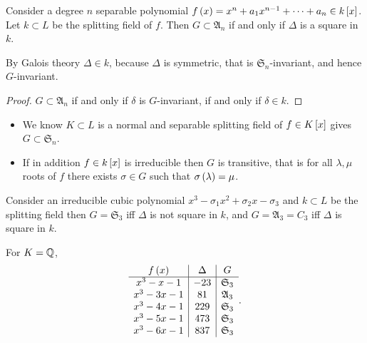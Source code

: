 \begin{theorem}
Consider a degree $ n $ separable polynomial $ f\rb{x} = x^n + a_1x^{n - 1} + \dots + a_n \in k\sb{x} $. Let $ k \subset L $ be the splitting field of $ f $. Then $ G \subset \mathfrak{A}_n $ if and only if $ \Delta $ is a square in $ k $.
\end{theorem}

By Galois theory $ \Delta \in k $, because $ \Delta $ is symmetric, that is $ \mathfrak{S}_n $-invariant, and hence $ G $-invariant.

\begin{proof}
$ G \subset \mathfrak{A}_n $ if and only if $ \delta $ is $ G $-invariant, if and only if $ \delta \in k $.
\end{proof}

\begin{remark*}
\hfill
\begin{itemize}
\item We know $ K \subset L $ is a normal and separable splitting field of $ f \in K\sb{x} $ gives $ G \subset \mathfrak{S}_n $.
\item If in addition $ f \in k\sb{x} $ is irreducible then $ G $ is transitive, that is for all $ \lambda, \mu $ roots of $ f $ there exists $ \sigma \in G $ such that $ \sigma\rb{\lambda} = \mu $.
\end{itemize}
\end{remark*}

\begin{theorem}
Consider an irreducible cubic polynomial $ x^3 - \sigma_1x^2 + \sigma_2x - \sigma_3 $ and $ k \subset L $ be the splitting field then $ G = \mathfrak{S}_3 $ iff $ \Delta $ is not square in $ k $, and $ G = \mathfrak{A}_3 = C_3 $ iff $ \Delta $ is square in $ k $.
\end{theorem}

\begin{example*}
For $ K = \Q $,
$$
\begin{array}{c|c|c}
f\rb{x} & \Delta & G \\
\hline
x^3 - x - 1 & -23 & \mathfrak{S}_3 \\
x^3 - 3x - 1 & 81 & \mathfrak{A}_3 \\
x^3 - 4x - 1 & 229 & \mathfrak{S}_3 \\
x^3 - 5x - 1 & 473 & \mathfrak{S}_3 \\
x^3 - 6x - 1 & 837 & \mathfrak{S}_3
\end{array}.
$$
\end{example*}


